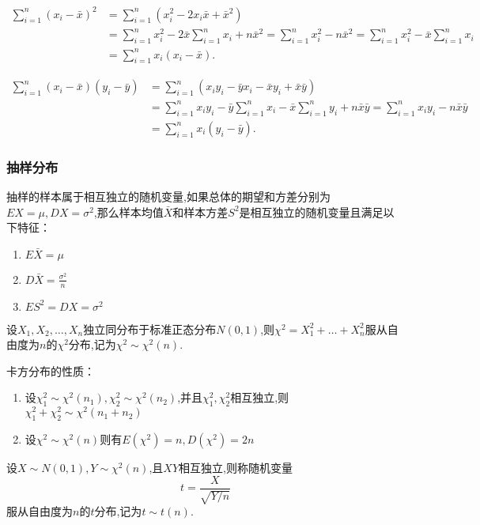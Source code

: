 \begin{prf}[$\sum^{n}_{i=1}(x_i-\bar{x})^2=\sum^{n}_{i=1}x_i(x_i-\bar{x})$]
    \begin{align*}
    \sum^{n}_{i=1}(x_i-\bar{x})^2&=\sum^{n}_{i=1}(x^2_i-2x_i\bar{x}+\bar{x}^2) \\
    &=\sum^{n}_{i=1}x^2_i-2\bar{x}\sum^{n}_{i=1}x_i+n\bar{x}^2=\sum^{n}_{i=1}x^2_i-n\bar{x}^2 =\sum^{n}_{i=1}x_i^2-\bar{x}\sum^{n}_{i=1}x_i\\
    &=\sum^{n}_{i=1}x_i(x_i-\bar{x}).
    \end{align*}
\end{prf}
\begin{prf}[$\sum^{n}_{i=1}(x_i-\bar{x})(y_i-\bar{y})=\sum^{n}_{i=1}x_i(y_i-\bar{y})$]
    \begin{align*}
    \sum^{n}_{i=1}(x_i-\bar{x})(y_i-\bar{y})&=\sum^{n}_{i=1}(x_iy_i-\bar{y}x_i-\bar{x}y_i+\bar{x}\bar{y}) \\
    &=\sum^{n}_{i=1}x_iy_i-\bar{y}\sum^{n}_{i=1}x_i-\bar{x}\sum^{n}_{i=1}y_i+n\bar{x}\bar{y}=\sum^{n}_{i=1}x_iy_i-n\bar{x}\bar{y} \\
    &=\sum^{n}_{i=1}x_i(y_i-\bar{y}).
    \end{align*}
\end{prf}
\begin{prf}[$\sum^{n}_{i=1}(X_i-\bar{X})^2=\sum^{n}_{i=1}(X_i-\mu)^2-n(\bar{X}-\mu)^2$]

\end{prf}
\subsubsection{抽样分布}
抽样的样本属于相互独立的随机变量,如果总体的期望和方差分别为$EX=\mu,DX=\sigma^2$,那么样本均值$\bar{X}$和样本方差$S^2$是相互独立的随机变量且满足以下特征：
\begin{enumerate}
    \item $E\bar{X}=\mu$
    \item $D\bar{X}=\frac{\sigma^2}{n}$
    \item $ES^2=DX=\sigma^2$
\end{enumerate}

\begin{definition}
    设$X_1,X_2,\dotsc,X_n$独立同分布于标准正态分布$N(0,1)$,则$\chi^2=X_1^2+\dotsc+X_n^2$服从自由度为$n$的$\chi^2$分布,记为$\chi^2\sim\chi^2(n)$.
\end{definition}
卡方分布的性质：
\begin{enumerate}
    \item 设$\chi^2_1\sim \chi^2(n_1),\chi^2_2\sim \chi^2(n_2)$,并且$\chi^2_1,\chi^2_2$相互独立,则$\chi^2_1+\chi^2_2\sim \chi^2(n_1+n_2)$ 
    \item 设$\chi^2\sim \chi^2(n)$则有$E(\chi^2)=n,D(\chi^2)=2n$
\end{enumerate}
\begin{definition}
    设$X\sim N(0,1),Y\sim \chi^2(n)$,且$XY$相互独立,则称随机变量
    \begin{equation*}
        t=\frac{X}{\sqrt{Y/n}}
    \end{equation*}
    服从自由度为$n$的$t$分布,记为$t\sim t(n)$.
\end{definition}

